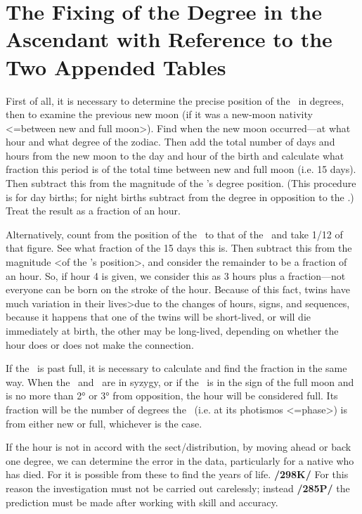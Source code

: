 \section{The Fixing of the Degree in the Ascendant with Reference to the Two Appended Tables}

First of all, it is necessary to determine the precise position of the \Sun\, in degrees, then to examine the previous new moon (if it was a new-moon nativity <=between new and full moon>). Find when the new moon occurred—at what hour and what degree of the zodiac. Then add the total number of days and hours from the new moon to the day and hour of the birth and calculate what fraction this period is of the total time between new and full moon (i.e. 15 days). Then subtract this from the magnitude of the \Sun’s degree position. (This procedure is for day births; for night births subtract from the degree in opposition to the \Sun.) Treat the result as a fraction of an hour.

Alternatively, count from the position of the \Sun\, to that of the \Moon\, and take 1/12 of that figure. See what fraction of the 15 days this is. Then subtract this from the magnitude <of the \Sun’s position>, and consider the remainder to be a fraction of an hour. So, if hour 4 is given, we consider this as 3 hours plus a fraction—not everyone can be born on the stroke of the hour. Because of this fact, twins have much variation in their lives>due to the changes of hours, signs, and sequences, because it happens that one of the twins will be short-lived, or will die immediately at birth, the other may be long-lived, depending on whether the hour does or does not make the connection.

If the \Moon\, is past full, it is necessary to calculate and find the fraction in the same way. When the \Sun\, and \Moon\, are in syzygy, or if the \Moon\, is in the sign of the full moon and is no more than 2° or 3° from opposition, the hour will be considered full. Its fraction will be the number of degrees the \Moon\, (i.e.
at its photismos <=phase>) is from either new or full, whichever is the case. 

If the hour is not in accord with the sect/distribution, by moving ahead or back one degree, we can determine the error in the data, particularly for a native who has died. For it is possible from these to find the years of life. \textbf{/298K/} For this reason the investigation must not be carried out carelessly; instead \textbf{/285P/} the prediction must be made after working with skill and accuracy. 

